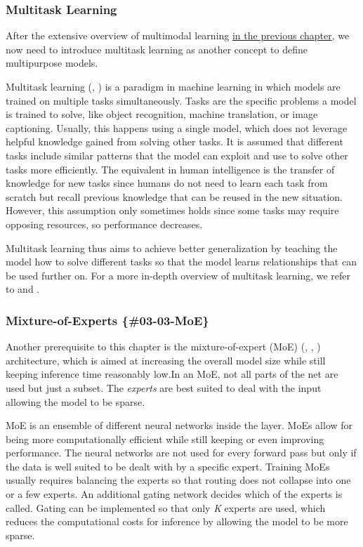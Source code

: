 \documentclass[
]{krantz}
\begin{document}
\hypertarget{multitask-learning}{%
\subsubsection{Multitask Learning}\label{multitask-learning}}

After the extensive overview of multimodal learning \protect\hyperlink{c02-00-multimodal}{in the previous chapter}, we now need to introduce multitask learning as another concept to define
multipurpose models.

Multitask learning (\citet{Caruana1997}, \citet{Crawshaw2020}) is a paradigm in machine learning in which models are trained on multiple tasks simultaneously.
Tasks are the specific problems a model is trained to solve, like object recognition, machine translation, or image captioning. Usually, this happens using a single model,
which does not leverage helpful knowledge gained from solving other tasks. It is assumed that different tasks include similar patterns that the model can exploit and use
to solve other tasks more efficiently. The equivalent in human intelligence is the transfer of knowledge for new tasks since humans do not need to learn each task from scratch
but recall previous knowledge that can be reused in the new situation. However, this assumption only sometimes holds since some tasks may require opposing resources, so
performance decreases.

Multitask learning thus aims to achieve better generalization by teaching the model how to solve different tasks so that the model learns relationships that can be used
further on. For a more in-depth overview of multitask learning, we refer to \citep{Caruana1997} and \citep{Crawshaw2020}.

\hypertarget{mixture-of-experts-03-03-moe}{%
\subsubsection{Mixture-of-Experts \{\#03-03-MoE\}}\label{mixture-of-experts-03-03-moe}}

Another prerequisite to this chapter is the mixture-of-expert (MoE) (\citet{Jacobs1991}, \citet{Jordan1994}, \citet{Shaazer2017}) architecture, which is aimed at increasing the overall model
size while still keeping inference time reasonably low.In an MoE, not all parts of the net are used but just a subset. The \emph{experts} are best suited to deal with the input
allowing the model to be sparse.

MoE is an ensemble of different neural networks inside the layer. MoEs allow for being more computationally efficient while still keeping or even improving performance. The
neural networks are not used for every forward pass but only if the data is well suited to be dealt with by a specific expert. Training MoEs usually requires balancing the
experts so that routing does not collapse into one or a few experts. An additional gating network decides which of the experts is called. Gating can be implemented so that
only \emph{K} experts are used, which reduces the computational costs for inference by allowing the model to be more sparse.
\end{document}
